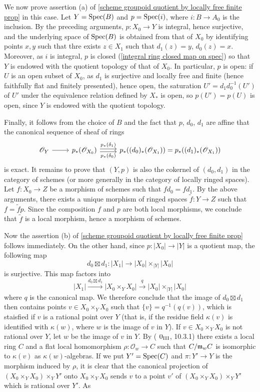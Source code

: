 We now prove assertion (a) of \cref{scheme groupoid quotient by locally free finite prop} in this case. Let $Y=\mathrm{Spec}(B)$ and $p=\mathrm{Spec}(i)$, where $i:B\to A_0$ is the inclusion. By the preceding arguments, $p:X_0\to Y$ is integral, hence surjective, and the underlying space of $\mathrm{Spec}(B)$ is obtained from that of $X_0$ by identifying points $x,y$ such that thre exists $z\in X_1$ such that $d_1(z)=y$, $d_0(z)=x$. Moreover, as $i$ is integral, $p$ is closed (\cref{integral ring closed map on spec}) so that $Y$ is endowed with the quotient topology of that of $X_0$. In particular, $p$ is open: if $U$ is an open subset of $X_0$, as $d_1$ is surjective and locally free and finite (hence faithfully flat and finitely presented), hence open, the saturation $U'=d_1d_0^{-1}(U')$ of $U'$ under the equivalence relation defined by $X_*$ is open, so $p(U')=p(U)$ is open, since $Y$ is endowed with the quotient topology.\par
Finally, it follows from the choice of $B$ and the fact that $p$, $d_0$, $d_1$ are affine that the canonical sequence of sheaf of rings
\[\begin{tikzcd}
\mathscr{O}_Y\ar[r]&p_*(\mathscr{O}_{X_0})\ar[r,shift left=2pt,"p_*(\delta_1)"]\ar[r,shift right=2pt,swap,"p_*(\delta_0)"]&p_*((d_0)_*(\mathscr{O}_{X_1}))=p_*((d_1)_*(\mathscr{O}_{X_1}))
\end{tikzcd}\]
is exact. It remains to prove that $(Y,p)$ is also the cokernel of $(d_0,d_1)$ in the category of schemes (or more generally in the category of locally ringed spaces). Let $f:X_0\to Z$ be a morphism of schemes such that $fd_0=fd_1$. By the above arguments, there exists a unique morphism of ringed spaces $\tilde{f}:Y\to Z$ such that $f=\tilde{f}p$. Since the composition $f$ and $p$ are both local morphisms, we conclude that $\tilde{f}$ is a local morphism, hence a morphism of schemes.\par
Now the assertion (b) of \cref{scheme groupoid quotient by locally free finite prop} follows immediately. On the other hand, since $p:|X_0|\to |Y|$ is a quotient map, the following map
\[d_0\boxtimes d_1:|X_1|\to |X_0|\times_{|Y|}|X_0|\]
is surjective. This map factors into
\[|X_1|\stackrel{d_0\boxtimes d_1}{\to} |X_0\times_YX_0|\stackrel{q}{\to}|X_0|\times_{|Y|}|X_0|\]
where $q$ is the canonical map. We therefore conclude that the image of $d_0\boxtimes d_1$ then contains points $v\in X_0\times_YX_0$ such that $\{v\}=q^{-1}(q(v))$, which is staisfied if $v$ is a rational point over $Y$ (that is, if the residue field $\kappa(v)$ is identified with $\kappa(w)$, where $w$ is the image of $v$ in $Y$). If $v\in X_0\times_YX_0$ is not rational over $Y$, let $w$ be the image of $v$ in $Y$. By (\cite{EGA3} $0_{\text{\Rmnum{3}}}$, 10.3.1) there exists a local ring $C$ and a flat local homomorphism $\rho:\mathscr{O}_w\to C$ such that $C/\mathfrak{m}_wC$ is isomorphic to $\kappa(v)$ as $\kappa(w)$-algebras. If we put $Y'=\mathrm{Spec}(C)$ and $\pi:Y'\to Y$ is the morphism induced by $\rho$, it is clear that the canonical projection of $(X_0\times_YX_0)\times_YY'$ onto $X_0\times_YX_0$ sends $v$ to a point $v'$ of $(X_0\times_YX_0)\times_YY'$ which is rational over $Y'$. As
